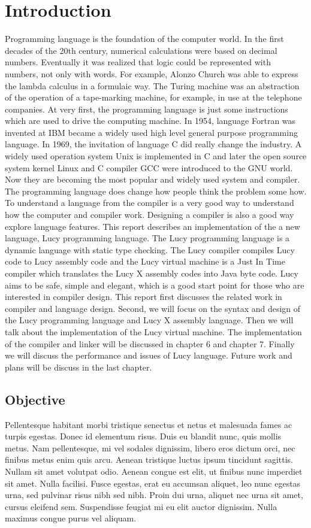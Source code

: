 \chapter{Introduction}
Programming language is the foundation of the computer world. In the first decades of the 20th century, numerical calculations were based on decimal numbers. Eventually it was realized that logic could be represented with numbers, not only with words. For example, Alonzo Church was able to express the lambda calculus in a formulaic way. The Turing machine was an abstraction of the operation of a tape-marking machine, for example, in use at the telephone companies. At very first, the programming language is just some instructions which are used to drive the computing machine. In 1954, language Fortran was invented at IBM became a widely used high level general purpose programming language. In 1969, the invitation of language C did really change the industry. A widely used operation system Unix is implemented in C and later the open source system kernel Linux and C compiler GCC were introduced to the GNU world. Now they are becoming the most popular and widely used system and compiler.
The programming language does change how people think the problem some how. To understand a language from the compiler is a very good way to understand how the computer and compiler work. Designing a compiler is also a good way explore language features.
This report describes an implementation of the a new language, Lucy programming language. The Lucy programming language is a dynamic language with static type checking. The Lucy compiler compiles Lucy code to Lucy assembly code and the Lucy virtual machine is a Just In Time compiler which translates the Lucy X assembly codes into Java byte code. Lucy aims to be safe, simple and elegant, which is a good start point for those who are interested in compiler design.
This report first discusses the related work in compiler and language design. Second, we will focus on the syntax and design of the Lucy programming language and Lucy X assembly language. Then we will talk about the implementation of the Lucy virtual machine. The implementation of the compiler and linker will be discussed in chapter 6 and chapter 7. Finally we will discuss the performance and issues of Lucy language. Future work and plans will be discuss in the last chapter.


\section{Objective}
Pellentesque habitant morbi tristique senectus et netus et malesuada fames ac turpis egestas. Donec id elementum risus. Duis eu blandit nunc, quis mollis metus. Nam pellentesque, mi vel sodales dignissim, libero eros dictum orci, nec finibus metus enim quis arcu. Aenean tristique luctus ipsum tincidunt sagittis. Nullam sit amet volutpat odio. Aenean congue est elit, ut finibus nunc imperdiet sit amet. Nulla facilisi. Fusce egestas, erat eu accumsan aliquet, leo nunc egestas urna, sed pulvinar risus nibh sed nibh. Proin dui urna, aliquet nec urna sit amet, cursus eleifend sem. Suspendisse feugiat mi eu elit auctor dignissim. Nulla maximus congue purus vel aliquam.


